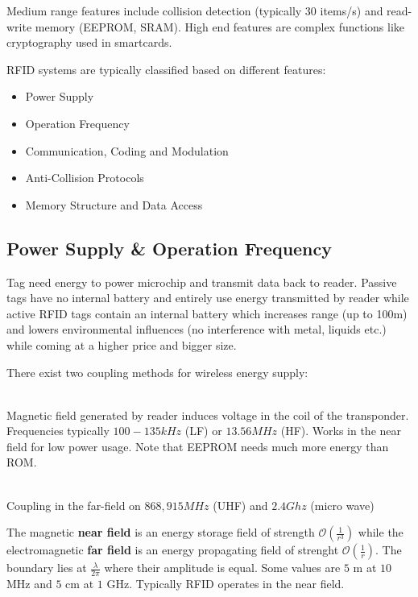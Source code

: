 \documentclass{article}
\newlength{\wideitemsep}
\let\olditem\item
\renewcommand{\item}{\setlength{\itemsep}{\wideitemsep}\olditem}
\renewcommand*{\O}[0] {\ensuremath{\mathcal{O}}}
\begin{document}
\begin{multicols}{2}
Medium range features include collision detection (typically 30 items/s) and
read-write memory (EEPROM, SRAM). High end features are complex functions like
cryptography used in smartcards.

RFID systems are typically classified based on different features:
\begin{itemize}
    \item Power Supply
    \item Operation Frequency
    \item Communication, Coding and Modulation
    \item Anti-Collision Protocols
    \item Memory Structure and Data Access
\end{itemize}

\subsection{Power Supply \& Operation Frequency}
Tag need energy to power microchip and transmit data back to reader. Passive
tags have no internal battery and entirely use energy transmitted by reader
while active RFID tags contain an internal battery which increases range (up to
100m) and lowers environmental influences (no interference with metal, liquids
etc.) while coming at a higher price and bigger size.

There exist two coupling methods for wireless energy supply:
\begin{description}
\item[Inductive Coupling (magnetic field)] \ \\
    Magnetic field generated by reader induces voltage in the coil of the
    transponder. Frequencies typically $100-135 kHz$ (LF) or $13.56 MHz$ (HF).
    Works in the near field for low power usage. Note that EEPROM needs much
    more energy than ROM.
\item[Electromagnetic Coupling] \ \\
    Coupling in the far-field on $868, 915 MHz$ (UHF) and $2.4 Ghz$ (micro
    wave) 
\end{description}

The magnetic {\bf near field} is an energy storage field of strength
$\O(\frac{1}{r^3})$ while the electromagnetic {\bf far field} is an energy
propagating field of strenght $\O(\frac{1}{r})$. The boundary lies at
$\frac{\lambda}{2\pi}$ where their amplitude is equal. Some values are $5$ m at
$10$ MHz and $5$ cm at $1$ GHz. Typically RFID operates in the near field.


\end{multicols}
\end{document}
